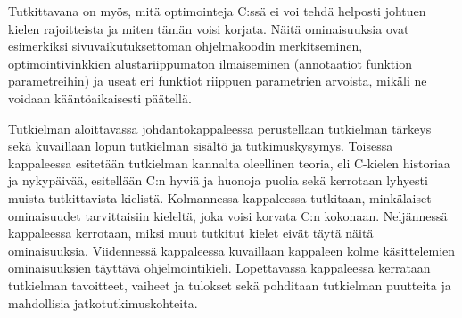 \documentclass{article}
\begin{document}
Tutkittavana on myös, mitä optimointeja C:ssä ei voi tehdä helposti johtuen
kielen rajoitteista ja miten tämän voisi korjata. Näitä ominaisuuksia ovat
esimerkiksi sivuvaikutuksettoman ohjelmakoodin merkitseminen,
optimointivinkkien alustariippumaton ilmaiseminen (annotaatiot funktion
parametreihin) ja useat eri funktiot riippuen parametrien arvoista, mikäli ne
voidaan kääntöaikaisesti päätellä.

Tutkielman aloittavassa johdantokappaleessa perustellaan tutkielman tärkeys
sekä kuvaillaan lopun tutkielman sisältö ja tutkimuskysymys.
Toisessa kappaleessa esitetään tutkielman kannalta oleellinen teoria, eli
C-kielen historiaa ja nykypäivää, esitellään C:n hyviä ja huonoja puolia sekä
kerrotaan lyhyesti muista tutkittavista kielistä.
Kolmannessa kappaleessa tutkitaan, minkälaiset ominaisuudet tarvittaisiin
kieleltä, joka voisi korvata C:n kokonaan.
Neljännessä kappaleessa kerrotaan, miksi muut tutkitut kielet eivät täytä näitä
ominaisuuksia.
Viidennessä kappaleessa kuvaillaan kappaleen kolme käsittelemien ominaisuuksien
täyttävä ohjelmointikieli.
Lopettavassa kappaleessa kerrataan tutkielman tavoitteet, vaiheet ja tulokset
sekä pohditaan tutkielman puutteita ja mahdollisia jatkotutkimuskohteita.



\end{document}
